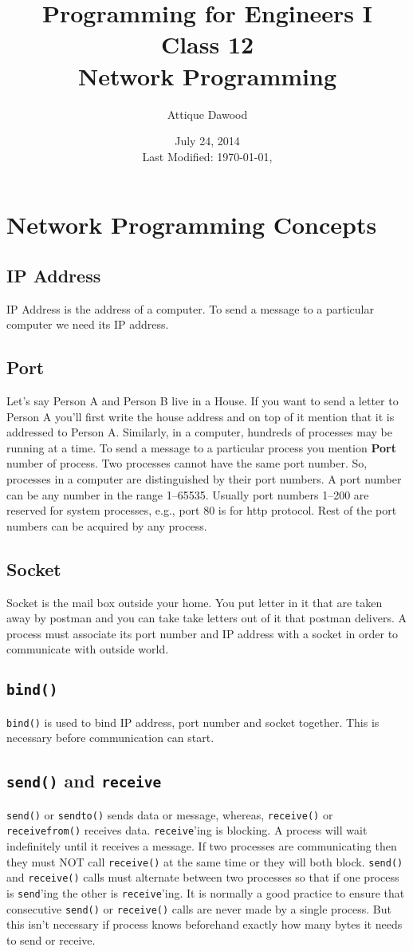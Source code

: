 \documentclass[12pt,a4paper]{article}
\title{\vspace{-2cm}Programming for Engineers I\\Class 12\\Network Programming}
\author{Attique Dawood}
\date{July 24, 2014\\[0.2cm] Last Modified: \today, \currenttime}
\begin{document}
\maketitle
\section{Network Programming Concepts}
\subsection{IP Address}
IP Address is the address of a computer. To send a message to a particular computer we need its IP address.
\subsection{Port}
Let's say Person A and Person B live in a House. If you want to send a letter to Person A you'll first write the house address and on top of it mention that it is addressed to Person A. Similarly, in a computer, hundreds of processes may be running at a time. To send a message to a particular process you mention \textbf{Port} number of process. Two processes cannot have the same port number. So, processes in a computer are distinguished by their port numbers. A port number can be any number in the range 1--65535. Usually port numbers 1--200 are reserved for system processes, e.g., port 80 is for http protocol. Rest of the port numbers can be acquired by any process.
\subsection{Socket}
Socket is the mail box outside your home. You put letter in it that are taken away by postman and you can take take letters out of it that postman delivers. A process must associate its port number and IP address with a socket in order to communicate with outside world.
\subsection{\texttt{bind()}}
\verb|bind()| is used to bind IP address, port number and socket together. This is necessary before communication can start.
\subsection{\texttt{send()} and \texttt{receive}}
\verb|send()| or \verb|sendto()| sends data or message, whereas, \verb|receive()| or \verb|receivefrom()| receives data. \verb|receive|'ing is blocking. A process will wait indefinitely until it receives a message. If two processes are communicating then they must NOT call \verb|receive()| at the same time or they will both block. \verb|send()| and \verb|receive()| calls must alternate between two processes so that if one process is \verb|send|'ing the other is \verb|receive|'ing. It is normally a good practice to ensure that consecutive \verb|send()| or \verb|receive()| calls are never made by a single process. But this isn't necessary if process knows beforehand exactly how many bytes it needs to send or receive.
\end{document}
